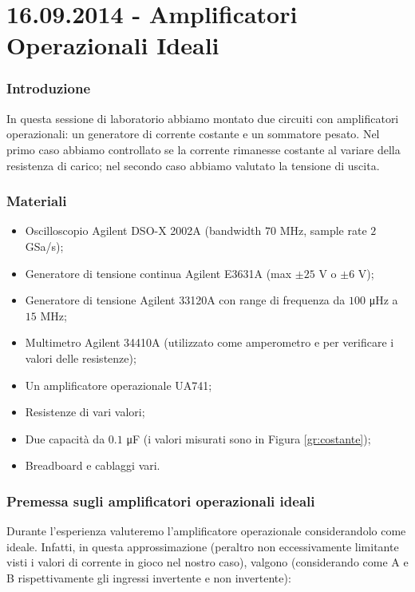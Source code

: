 \part*{16.09.2014 - Amplificatori Operazionali Ideali}

\section{Introduzione}

In questa sessione di laboratorio abbiamo montato due circuiti con amplificatori operazionali: un generatore di corrente costante e un sommatore pesato. Nel primo caso abbiamo controllato se la corrente rimanesse costante al variare della resistenza di carico; nel secondo caso abbiamo valutato la tensione di uscita.

\section{Materiali}

\begin{itemize} [noitemsep]
\item Oscilloscopio Agilent DSO-X 2002A (bandwidth $70$ \si{\mega\hertz}, sample rate $2$ GSa/s);
\item Generatore di tensione continua Agilent E3631A (max $\pm 25$ \si{\volt} o $\pm 6$ \si{\volt});
\item Generatore di tensione Agilent 33120A con range di frequenza da $100$ \si{\micro\hertz} a $15$ \si{\mega\hertz};
\item Multimetro Agilent 34410A (utilizzato come amperometro e per verificare i valori delle resistenze);
\item Un amplificatore operazionale UA741;
\item Resistenze di vari valori;
\item Due capacità da $0.1$ \si{\micro\farad} (i valori misurati sono in Figura \ref{gr:costante});
\item Breadboard e cablaggi vari.
\end{itemize}

\section{Premessa sugli amplificatori operazionali ideali}

Durante l'esperienza valuteremo l'amplificatore operazionale considerandolo come ideale. Infatti, in questa approssimazione (peraltro non eccessivamente limitante visti i valori di corrente in gioco nel nostro caso), valgono (considerando come A e B rispettivamente gli ingressi invertente e non invertente):

